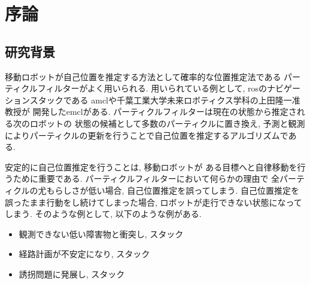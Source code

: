 \chapter{序論}

\section{研究背景}

移動ロボットが自己位置を推定する方法として確率的な位置推定法である
パーティクルフィルターがよく用いられる. 
用いられている例として, rosのナビゲーションスタックである
amcl\cite{amcl_github}や千葉工業大学未来ロボティクス学科の上田隆一准教授が
開発したemcl\cite{emcl_github}がある. 
パーティクルフィルターは現在の状態から推定される次のロボットの
状態の候補として多数のパーティクルに置き換え, 
予測と観測によりパーティクルの更新を行うことで自己位置を推定するアルゴリズムである. 

安定的に自己位置推定を行うことは, 移動ロボットが
ある目標へと自律移動を行うために重要である. 
パーティクルフィルターにおいて何らかの理由で
全パーティクルの尤もらしさが低い場合, 
自己位置推定を誤ってしまう. 
自己位置推定を誤ったまま行動をし続けてしまった場合, 
ロボットが走行できない状態になってしまう. 
そのような例として, 以下のような例がある. 

\begin{itemize}
  \item 観測できない低い障害物と衝突し, スタック
  \item 経路計画が不安定になり, スタック
  \item 誘拐問題\cite{gutmann2002etal}に発展し, スタック
\end{itemize}

